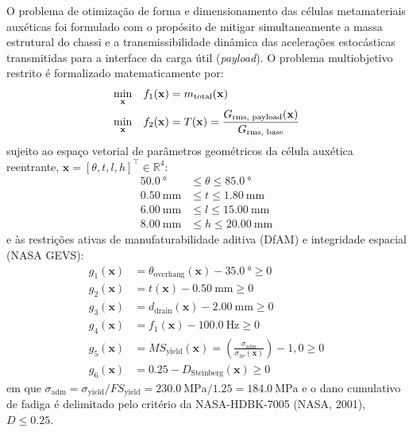 O problema de otimização de forma e dimensionamento das células metamateriais auxéticas foi formulado com o propósito de mitigar simultaneamente a massa estrutural do chassi e a transmissibilidade dinâmica das acelerações estocásticas transmitidas para a interface da carga útil (\textit{payload}). O problema multiobjetivo restrito é formalizado matematicamente por:
\begin{equation}
  \begin{aligned}
    \min_{\mathbf{x}} \quad & f_1(\mathbf{x}) = m_{\text{total}}(\mathbf{x}) \\
    \min_{\mathbf{x}} \quad & f_2(\mathbf{x}) = T(\mathbf{x}) = \frac{G_{\text{rms, payload}}(\mathbf{x})}{G_{\text{rms, base}}}
  \end{aligned}
  \label{eq:objetivos}
\end{equation}
sujeito ao espaço vetorial de parâmetros geométricos da célula auxética reentrante, $\mathbf{x} = [\theta, t, l, h]^{\top} \in \mathbb{R}^4$:
\begin{equation}
  \begin{aligned}
    \SI{50.0}{\degree} &\le \theta \le \SI{85.0}{\degree} \\
    \SI{0.50}{\milli\metre} &\le t \le \SI{1.80}{\milli\metre} \\
    \SI{6.00}{\milli\metre} &\le l \le \SI{15.00}{\milli\metre} \\
    \SI{8.00}{\milli\metre} &\le h \le \SI{20.00}{\milli\metre}
  \end{aligned}
  \label{eq:limites}
\end{equation}
e às restrições ativas de manufaturabilidade aditiva (DfAM) e integridade espacial (NASA GEVS):
\begin{equation}
  \begin{aligned}
    g_1(\mathbf{x}) &= \theta_{\text{overhang}}(\mathbf{x}) - \SI{35.0}{\degree} \ge 0 \\
    g_2(\mathbf{x}) &= t(\mathbf{x}) - \SI{0.50}{\milli\metre} \ge 0 \\
    g_3(\mathbf{x}) &= d_{\text{drain}}(\mathbf{x}) - \SI{2.00}{\milli\metre} \ge 0 \\
    g_4(\mathbf{x}) &= f_1(\mathbf{x}) - \SI{100.0}{\hertz} \ge 0 \\
    g_5(\mathbf{x}) &= MS_{\text{yield}}(\mathbf{x}) = \left( \frac{\sigma_{\text{adm}}}{\sigma_{3\sigma}(\mathbf{x})} \right) - 1{,}0 \ge 0 \\
    g_6(\mathbf{x}) &= \num{0.25} - D_{\text{Steinberg}}(\mathbf{x}) \ge 0
  \end{aligned}
  \label{eq:restricoes}
\end{equation}
em que $\sigma_{\text{adm}} = \sigma_{\text{yield}} / FS_{\text{yield}} = \SI{230.0}{\mega\pascal} / \num{1.25} = \SI{184.0}{\mega\pascal}$ e o dano cumulativo de fadiga é delimitado pelo critério da NASA-HDBK-7005 (NASA, 2001), $D \le \num{0.25}$.

